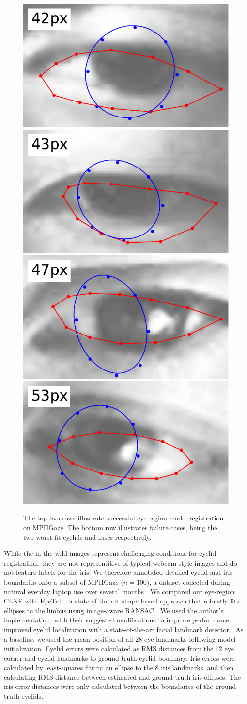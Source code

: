 \begin{figure}
    \par \vspace{0.1em}
    \includegraphics[width=0.244\columnwidth]{figs/ldmks_examples/idx_84.pdf}\hfill
    \includegraphics[width=0.244\columnwidth]{figs/ldmks_examples/idx_89.pdf}\hfill
    \includegraphics[width=0.244\columnwidth]{figs/ldmks_examples/idx_26.pdf}\hfill
    \includegraphics[width=0.244\columnwidth]{figs/ldmks_examples/idx_81.pdf}
    \caption{The top two rows illustrate successful eye-region model registration on MPIIGaze. The bottom row illustrates failure cases, being the two worst fit eyelids and irises respectively.}
    \label{fig:clnf_results}
\end{figure}

While the in-the-wild images represent challenging conditions for eyelid registration, they are not representitive of typical webcam-style images and do not feature labels for the iris. We therefore annotated detailed eyelid and iris boundaries onto a subset of MPIIGaze ($n\!=\!100$), a dataset collected during natural everday laptop use over several months \cite{zhang15_cvpr}. We compared our eye-region CLNF with EyeTab \cite{wood2014eyetab}, a state-of-the-art shape-based approach that robustly fits ellipses to the limbus using image-aware RANSAC \cite{swirski2012robust}. We used the author's implementation, with their suggested modifications to improve performance: improved eyelid localization with a state-of-the-art facial landmark detector \cite{baltrusaitis2013constrained}. As a baseline, we used the mean position of all 28 eye-landmarks following model initialization. Eyelid errors were calculated as RMS distances from the 12 eye corner and eyelid landmarks to ground truth eyelid boudnary. Iris errors were calculated by least-squares fitting an ellipse to the 8 iris landmarks, and then calculating RMS distance between estimated and ground truth iris ellipses. The iris error distances were only calculated between the boundaries of the ground truth eyelids.

